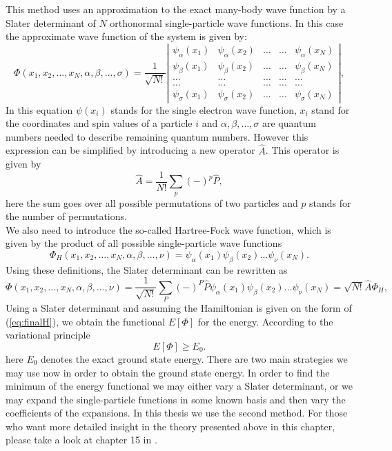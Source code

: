 This method uses an approximation to the exact many-body wave function by a Slater determinant of $N$ orthonormal single-particle wave functions. In this case the approximate wave function of the system is given by:
\begin{equation}
\Phi(x_1, x_2,\dots ,x_N,\alpha,\beta,\dots, \sigma)=\frac{1}{\sqrt{N!}}
\left| \begin{array}{ccccc} \psi_{\alpha}(x_1)& \psi_{\alpha}(x_2)& \dots & \dots & \psi_{\alpha}(x_N)\\
\psi_{\beta}(x_1)&\psi_{\beta}(x_2)& \dots & \dots & \psi_{\beta}(x_N)\\  
\dots & \dots & \dots & \dots & \dots \\
\dots & \dots & \dots & \dots & \dots \\
\psi_{\sigma}(x_1)&\psi_{\sigma}(x_2)& \dots & \dots & \psi_{\sigma}(x_N)\end{array} \right|, \label{eq:HartreeFockDet}
\end{equation}
In this equation $\psi(x_i)$ stands for the single electron wave function, $x_i$ stand for the coordinates and spin values of a particle $i$ and $\alpha, \beta,…,\sigma$ are quantum numbers needed to describe remaining quantum numbers.
However this expression can be simplified by introducing a new operator $\hat{A}$. This operator is given by 
\begin{equation}
\hat{A} = \frac{1}{N!}\sum_{p} (-)^p\hat{P},
\label{antiSymmetryOperator}
\end{equation}
here the sum goes over all possible permutations of two particles and $p$  stands for the number of permutations.\\
We also need to introduce the so-called Hartree-Fock wave function, which is given by the product of all possible single-particle wave functions
\begin{equation}
\Phi_H(x_1,x_2,\dots,x_N,\alpha,\beta,\dots,\nu) =
\psi_{\alpha}(x_1)
\psi_{\beta}(x_2)\dots\psi_{\nu}(x_N).
\end{equation}
Using these definitions, the  Slater determinant can be rewritten as
\begin{equation}\label{determ}
\Phi(x_1,x_2,\dots,x_N,\alpha,\beta,\dots,\nu) = \frac{1}{\sqrt{N!}}\sum_{P} (-)^P\hat{P}\psi_{\alpha}(x_1)
\psi_{\beta}(x_2)\dots\psi_{\nu}(x_N)=\sqrt{N!}\hat{A}\Phi_H,
\end{equation}
Using a Slater determinant and assuming the Hamiltonian is given on the form of (\ref{eq:finalH}), we obtain the functional $E[\Phi]$ for the energy. According to the variational principle
\begin{equation}
E[\Phi] \ge E_0.
\end{equation}
here $E_0$ denotes the exact ground state energy.  There are two main
strategies we may use now in order to obtain the ground state
energy. In order to find the minimum of the energy functional we may
either vary a Slater determinant, or we may expand the single-particle
functions in some known basis and then vary the coefficients of the
expansions. In this thesis we use the second method. For those who
want more detailed insight in the theory presented above in this
chapter, please take a look at chapter 15 in
\cite{mortenhjorth-jensenCOMPUTATIONALPHYSICS2015}.

